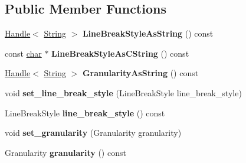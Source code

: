 \subsection*{Public Member Functions}
\begin{DoxyCompactItemize}
\item 
\mbox{\label{classv8_1_1internal_1_1JSSegmenter_ad45e47bbcc3a8ca1a560b9c30ca41e19}} 
\mbox{\hyperlink{classv8_1_1internal_1_1Handle}{Handle}}$<$ \mbox{\hyperlink{classv8_1_1internal_1_1String}{String}} $>$ {\bfseries Line\+Break\+Style\+As\+String} () const
\item 
\mbox{\label{classv8_1_1internal_1_1JSSegmenter_a0679338204b24123407777e1f7d0dbd8}} 
const \mbox{\hyperlink{classchar}{char}} $\ast$ {\bfseries Line\+Break\+Style\+As\+C\+String} () const
\item 
\mbox{\label{classv8_1_1internal_1_1JSSegmenter_ad521e062c1e24b0744154d1bb8d14a7c}} 
\mbox{\hyperlink{classv8_1_1internal_1_1Handle}{Handle}}$<$ \mbox{\hyperlink{classv8_1_1internal_1_1String}{String}} $>$ {\bfseries Granularity\+As\+String} () const
\item 
\mbox{\label{classv8_1_1internal_1_1JSSegmenter_aaa9ebcfa4593870f7d55e5bddfa4e0c5}} 
void {\bfseries set\+\_\+line\+\_\+break\+\_\+style} (Line\+Break\+Style line\+\_\+break\+\_\+style)
\item 
\mbox{\label{classv8_1_1internal_1_1JSSegmenter_a6d077a6ef09d61c7cc2106fb4761394e}} 
Line\+Break\+Style {\bfseries line\+\_\+break\+\_\+style} () const
\item 
\mbox{\label{classv8_1_1internal_1_1JSSegmenter_a5acc407a1f90aea965e199b0e0ad6f4b}} 
void {\bfseries set\+\_\+granularity} (Granularity granularity)
\item 
\mbox{\label{classv8_1_1internal_1_1JSSegmenter_a81544b399af411f36d2e59c3a0a4af33}} 
Granularity {\bfseries granularity} () const
\item 
\mbox{\label{classv8_1_1internal_1_1JSSegmenter_af1762a04b76be1b23b27c425884ce589}} 

\end{DoxyCompactItemize}
